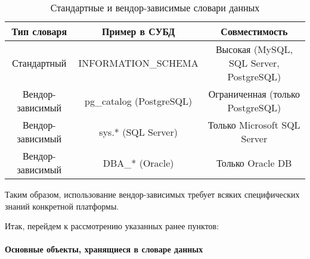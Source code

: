 \begin{table}[H]
    \centering
    \begin{tabular}{|c|c|c|}
        \hline
        \textbf{Тип словаря} & \textbf{Пример в СУБД} & \textbf{Совместимость} \\
        \hline
        Стандартный & INFORMATION\_SCHEMA & Высокая (MySQL, SQL Server, PostgreSQL) \\
        \hline
        Вендор-зависимый & pg\_catalog (PostgreSQL) & Ограниченная (только PostgreSQL) \\
        \hline
        Вендор-зависимый & sys.* (SQL Server) & Только Microsoft SQL Server \\
        \hline
        Вендор-зависимый & DBA\_* (Oracle) & Только Oracle DB \\
        \hline
    \end{tabular}
    \caption{Стандартные и вендор-зависимые словари данных}
    \label{tab:data_dictionary_comparison}
\end{table}

Таким образом, использование вендор-зависимых требует всяких специфических знаний конкретной платформы.

Итак, перейдем к рассмотрению указанных ранее пунктов:

\paragraph{Основные объекты, хранящиеся в словаре данных} ~\\


